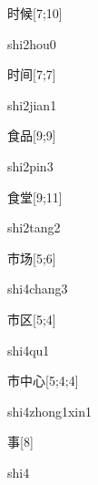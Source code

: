\begin{verbete}{时候}[7;10]
\begin{pronuncia}{shi2hou0}
\end{pronuncia}
\end{verbete}

\begin{verbete}{时间}[7;7]
\begin{pronuncia}{shi2jian1}
\end{pronuncia}
\end{verbete}

\begin{verbete}{食品}[9;9]
\begin{pronuncia}{shi2pin3}
\end{pronuncia}
\end{verbete}

\begin{verbete}{食堂}[9;11]
\begin{pronuncia}{shi2tang2}
\end{pronuncia}
\end{verbete}

\begin{verbete}{市场}[5;6]
\begin{pronuncia}{shi4chang3}
\end{pronuncia}
\end{verbete}

\begin{verbete}[shi4qu1]{市区}[5;4]
\begin{pronuncia}{shi4qu1}
\end{pronuncia}
\end{verbete}

\begin{verbete}{市中心}[5;4;4]
\begin{pronuncia}{shi4zhong1xin1}
\end{pronuncia}
\end{verbete}

\begin{verbete}[shi4]{事}[8]
\begin{pronuncia}{shi4}
\end{pronuncia}
\end{verbete}

